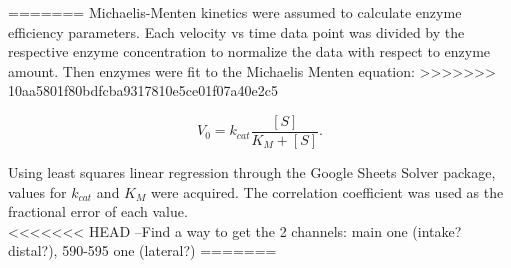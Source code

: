 \documentclass[9pt,twocolumn,twoside]{pnas-new}
\begin{document}
{=======
Michaelis-Menten kinetics were assumed to calculate enzyme efficiency parameters. Each velocity vs time data point was divided by the respective enzyme concentration to normalize the data with respect to enzyme amount. Then enzymes were fit to the Michaelis Menten equation:
>>>>>>> 10aa5801f80bdfcba9317810e5ce01f07a40e2c5

\begin{equation*}
  V_0 = k_{cat} \frac{[S]}{K_M+[S]}.
\end{equation*}

Using least squares linear regression through the Google Sheets Solver package, values for $k_{cat}$ and $K_M$ were acquired. The correlation coefficient was used as the fractional error of each value.\\

<<<<<<< HEAD
--Find a way to get the 2 channels: main one (intake? distal?), 590-595 one (lateral?)
=======
}

\showmatmethods %

\pnasbreak


\end{document}
